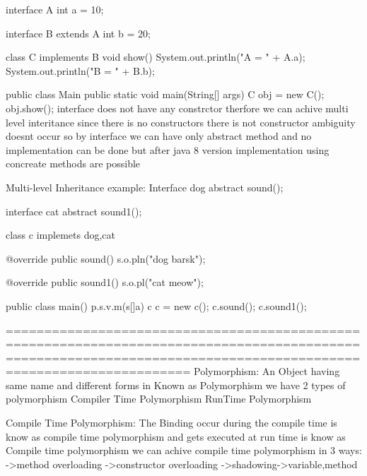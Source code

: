           interface A {
              int a = 10;
          }
          
          interface B extends A {
              int b = 20;
          }
          
          class C implements B {
              void show() {
                  System.out.println("A = " + A.a);
                  System.out.println("B = " + B.b);
              }
          }
          
          public class Main {
              public static void main(String[] args) {
                  C obj = new C();
                  obj.show();
              }
          }
          interface does not have any constrctor therfore we can achive multi level interitance 
          since there is no constructors there is not constructor ambiguity doesnt occur
          so by interface we can have only abstract method and no implementation can be done but after java 8 version implementation using concreate methods are possible


Multi-level Inheritance example:
Interface dog{
    abstract sound();
    }


interface cat{
     abstract sound1();
     }

class c implemets dog,cat{
      @override
      public sound(){
         s.o.pln("dog barsk");
         }

     @override
     public sound1(){
         s.o.pl("cat meow");
         }
         }

public class  main(){
          p.s.v.m(s[]a){
            c c = new c();
            c.sound();
            c.sound1();
            }
            }
   
==================================================================================================================================================================
Polymorphism:
          An Object having same name and different forms in Known as Polymorphism
          we have 2 types of polymorphism
                    Compiler Time Polymorphism
                    RunTime Polymorphism

Compile Time Polymorphism:
                    The Binding occur during the compile time is know as compile time polymorphism and gets executed at run time is know as Compile time polymorphism
                    we can achive compile time polymorphism in 3 ways:
                              ->method overloading
                              ->constructor overloading
                              ->shadowing->variable,method

